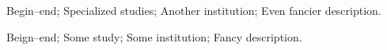 \addstudy%
{%
    Begin--end;%
    Specialized studies;%
    Another institution;%
    Even fancier description.%
}%

\addstudy%
{%
    Beign--end;%
    Some study;%
    Some institution;%
    Fancy description.%
}%
